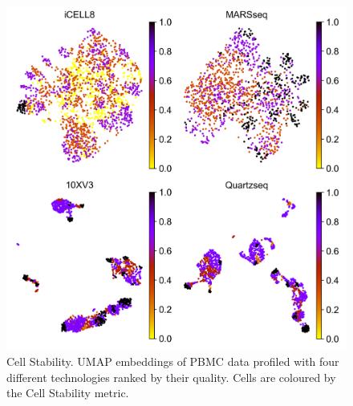 \documentclass[11pt, titlepage, twoside]{article}
\begin{document}
\begin{figure}[htbp]
\centering
\includegraphics[keepaspectratio,width=\textwidth,width=0.50\textheight]{Figure_Stability.png}
\caption[]{Cell Stability. UMAP embeddings of PBMC data profiled with four different technologies ranked by their quality. Cells are coloured by the Cell Stability metric.}\label{Figure_Stability}
\end{figure}
\clearpage

\end{document}
